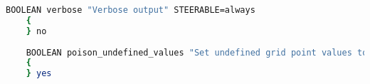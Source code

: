 
\begin{lstlisting}[language=bash]
    BOOLEAN verbose "Verbose output" STEERABLE=always
    {
    } no
    
    BOOLEAN poison_undefined_values "Set undefined grid point values to nan" STEERABLE=always
    {
    } yes
\end{lstlisting}